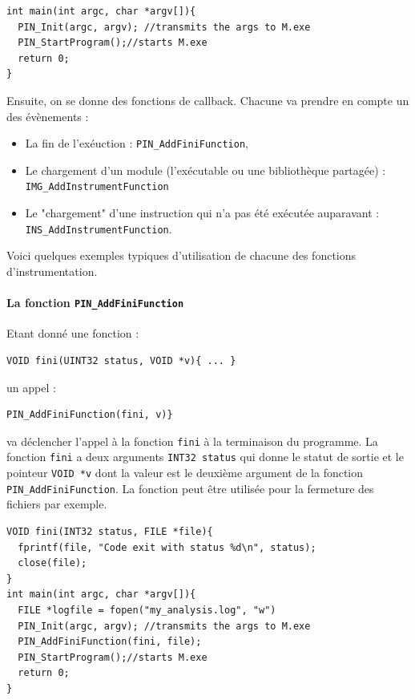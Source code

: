 \documentclass{book}
\newcommand{\code}[1]{\texttt{#1}}
\begin{document}
\begin{verbatim}
int main(int argc, char *argv[]){
  PIN_Init(argc, argv); //transmits the args to M.exe
  PIN_StartProgram();//starts M.exe
  return 0;
}
\end{verbatim}

Ensuite, on se donne des fonctions de callback. Chacune va prendre en compte un des évènements : 
\begin{itemize}
\item La fin de l'exéuction : \code{PIN\_AddFiniFunction},
\item Le chargement d'un module (l'exécutable ou une bibliothèque partagée) : \code{IMG\_AddInstrumentFunction}
\item Le "chargement" d'une instruction qui n'a pas été exécutée auparavant : \code{INS\_AddInstrumentFunction}.
\end{itemize}

Voici quelques exemples typiques d'utilisation de chacune des fonctions d'instrumentation.

\paragraph{La fonction \code{PIN\_AddFiniFunction}} 

Etant donné une fonction :

\begin{verbatim}
VOID fini(UINT32 status, VOID *v){ ... } 
\end{verbatim}

un appel :

\begin{verbatim}
PIN_AddFiniFunction(fini, v)} 
\end{verbatim}

va déclencher l'appel à la fonction \code{fini}  à la terminaison du programme. La fonction \code{fini} a deux arguments \code{INT32 status} qui donne  le statut de sortie et le pointeur \code{VOID *v} dont la valeur est le deuxième argument de la fonction \code{PIN\_AddFiniFunction}. La fonction peut être utilisée pour la fermeture des fichiers par exemple. 


\begin{verbatim}
VOID fini(INT32 status, FILE *file){
  fprintf(file, "Code exit with status %d\n", status);
  close(file);
}
int main(int argc, char *argv[]){
  FILE *logfile = fopen("my_analysis.log", "w")
  PIN_Init(argc, argv); //transmits the args to M.exe
  PIN_AddFiniFunction(fini, file);
  PIN_StartProgram();//starts M.exe
  return 0;
}
\end{verbatim}
\end{document}

